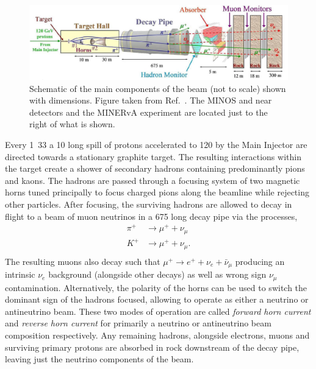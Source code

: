 \begin{figure} %
    \includegraphics[width=\textwidth]{diagrams/4-chips/numi_beam.png}
    \caption[Schematic of the main components of the \numi beam.]
    {Schematic of the main components of the \numi beam (not to scale) shown with dimensions.
        Figure taken from Ref.~\cite{adamson2016}. The MINOS and \nova near detectors and the
        MINERvA experiment are located just to the right of what is shown.}
    \label{fig:numi_beam}
\end{figure}

Every \unit{1.33}{} a \unit{10}{\mu{}} long spill of protons accelerated
to \unit{120}{\GeV} by the Main Injector are directed towards a stationary graphite target. The
resulting interactions within the target create a shower of secondary hadrons containing
predominantly pions and kaons. The hadrons are passed through a focusing system of two magnetic
horns tuned principally to focus charged pions along the beamline while rejecting other particles.
After focusing, the surviving hadrons are allowed to decay in flight to a beam of muon neutrinos
in a \unit{675}{} long decay pipe via the processes,
\begin{align} %
    \pi^{+} & \rightarrow\mu^{+}+\nu_{\mu}  \\
    K^{+}   & \rightarrow\mu^{+}+\nu_{\mu}. \\
    \label{eq:numi_decays}
\end{align}
The resulting muons also decay such that $\mu^{+}\rightarrow e^{+}+\nu_{e}+\bar{\nu}_{\mu}$
producing an intrinsic $\nu_{e}$ background (alongside other decays) as well as wrong sign
$\nu_{\mu}$ contamination. Alternatively, the polarity of the horns can be used to switch the
dominant sign of the hadrons focused, allowing \numi to operate as either a neutrino or
antineutrino beam. These two modes of operation are called \emph{forward horn current} and
\emph{reverse horn current} for primarily a neutrino or antineutrino beam composition
respectively. Any remaining hadrons, alongside electrons, muons and surviving primary protons are
absorbed in rock downstream of the decay pipe, leaving just the neutrino components of the beam.

